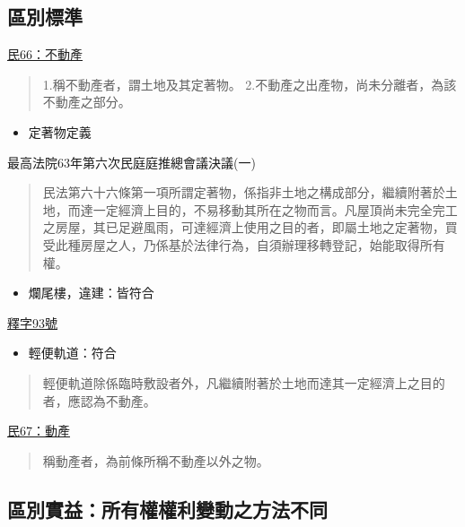 \documentclass[
]{book}
\providecommand{\tightlist}{%
  \setlength{\itemsep}{0pt}\setlength{\parskip}{0pt}}
\begin{document}
\hypertarget{ux5340ux5225ux6a19ux6e96}{%
\subsection{區別標準}\label{ux5340ux5225ux6a19ux6e96}}

\href{https://law.moj.gov.tw/LawClass/LawSingle.aspx?pcode=B0000001\&flno=66}{民66：不動產}

\begin{quote}
1.稱不動產者，謂土地及其定著物。
2.不動產之出產物，尚未分離者，為該不動產之部分。
\end{quote}

\begin{itemize}
\tightlist
\item
  定著物定義
\end{itemize}

最高法院63年第六次民庭庭推總會議決議(一)

\begin{quote}
民法第六十六條第一項所謂定著物，係指非土地之構成部分，繼續附著於土地，而達一定經濟上目的，不易移動其所在之物而言。凡屋頂尚未完全完工之房屋，其已足避風雨，可達經濟上使用之目的者，即屬土地之定著物，買受此種房屋之人，乃係基於法律行為，自須辦理移轉登記，始能取得所有權。
\end{quote}

\begin{itemize}
\tightlist
\item
  爛尾樓，違建：皆符合
\end{itemize}

\href{https://cons.judicial.gov.tw/docdata.aspx?fid=100\&id=310274}{釋字93號}

\begin{itemize}
\tightlist
\item
  輕便軌道：符合
\end{itemize}

\begin{quote}
輕便軌道除係臨時敷設者外，凡繼續附著於土地而達其一定經濟上之目的者，應認為不動產。
\end{quote}

\href{https://law.moj.gov.tw/LawClass/LawSingle.aspx?pcode=B0000001\&flno=67}{民67：動產}

\begin{quote}
稱動產者，為前條所稱不動產以外之物。
\end{quote}

\hypertarget{ux5340ux5225ux5be6ux76caux6240ux6709ux6b0aux6b0aux5229ux8b8aux52d5ux4e4bux65b9ux6cd5ux4e0dux540c}{%
\subsection{區別實益：所有權權利變動之方法不同}\label{ux5340ux5225ux5be6ux76caux6240ux6709ux6b0aux6b0aux5229ux8b8aux52d5ux4e4bux65b9ux6cd5ux4e0dux540c}}
\end{document}
